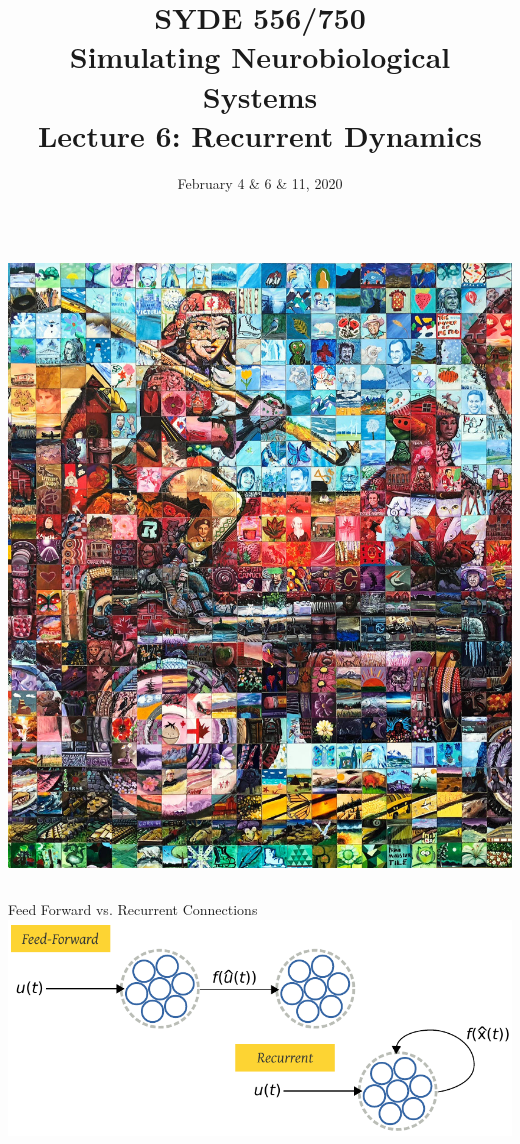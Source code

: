 \documentclass[handout,aspectratio=169]{beamer}
\date{February 4 \& 6 \& 11, 2020}
\title{SYDE 556/750 \\ Simulating Neurobiological Systems \\ Lecture 6: Recurrent Dynamics}
\begin{document}
	
	\begin{frame}{}
		\vspace{0.5cm}
		\begin{columns}[c]
			\MakeTitle
			\includegraphics[width=\textwidth]{media/canada_150_mosaic_engine_small.jpg}
		\end{columns}
	\end{frame}

	\begin{frame}{Feed Forward vs. Recurrent Connections}
		\centering
		\includegraphics{media/feed_forward_recurrent.pdf}
	\end{frame}
\end{document}
